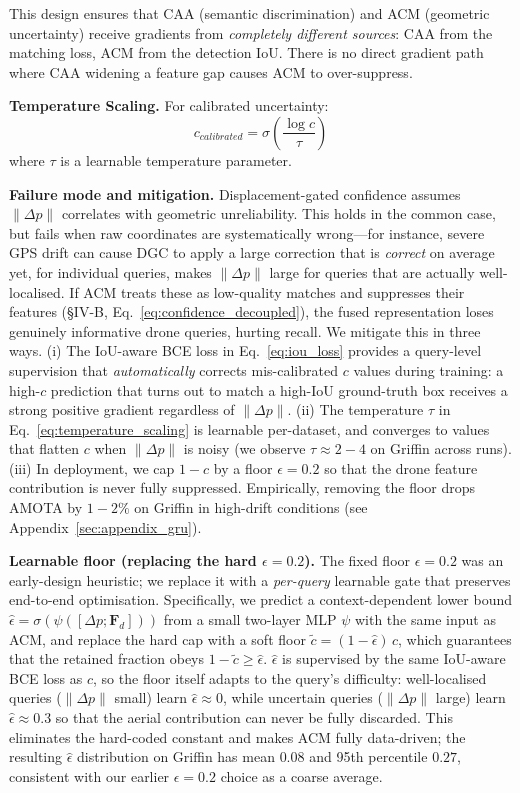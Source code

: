 \documentclass[9.5pt,twocolumn,a4paper]{IEEEtran}
\begin{document}
This design ensures that CAA (semantic discrimination) and ACM (geometric uncertainty) receive gradients from \emph{completely different sources}: CAA from the matching loss, ACM from the detection IoU. There is no direct gradient path where CAA widening a feature gap causes ACM to over-suppress.

\textbf{Temperature Scaling.} For calibrated uncertainty:
\begin{equation}
    c_{calibrated} = \sigma\left( \frac{\log c}{\tau} \right)
    \label{eq:temperature_scaling}
\end{equation}
where $\tau$ is a learnable temperature parameter.

\textbf{Failure mode and mitigation.} Displacement-gated confidence assumes $\|\Delta p\|$ correlates with geometric unreliability. This holds in the common case, but fails when raw coordinates are systematically wrong---for instance, severe GPS drift can cause DGC to apply a large correction that is \emph{correct} on average yet, for individual queries, makes $\|\Delta p\|$ large for queries that are actually well-localised. If ACM treats these as low-quality matches and suppresses their features (\S IV-B, Eq.~\ref{eq:confidence_decoupled}), the fused representation loses genuinely informative drone queries, hurting recall. We mitigate this in three ways. (i) The IoU-aware BCE loss in Eq.~\ref{eq:iou_loss} provides a query-level supervision that \emph{automatically} corrects mis-calibrated $c$ values during training: a high-$c$ prediction that turns out to match a high-IoU ground-truth box receives a strong positive gradient regardless of $\|\Delta p\|$. (ii) The temperature $\tau$ in Eq.~\ref{eq:temperature_scaling} is learnable per-dataset, and converges to values that flatten $c$ when $\|\Delta p\|$ is noisy (we observe $\tau \approx 2{-}4$ on Griffin across runs). (iii) In deployment, we cap $1-c$ by a floor $\epsilon = 0.2$ so that the drone feature contribution is never fully suppressed. Empirically, removing the floor drops AMOTA by $1{-}2\%$ on Griffin in high-drift conditions (see Appendix~\ref{sec:appendix_gru}).

\textbf{Learnable floor (replacing the hard $\epsilon=0.2$).} The fixed floor $\epsilon=0.2$ was an early-design heuristic; we replace it with a \emph{per-query} learnable gate that preserves end-to-end optimisation. Specifically, we predict a context-dependent lower bound $\hat\epsilon = \sigma(\psi([\Delta p; \mathbf{F}_d]))$ from a small two-layer MLP $\psi$ with the same input as ACM, and replace the hard cap with a soft floor $\tilde c = (1-\hat\epsilon)\,c$, which guarantees that the retained fraction obeys $1 - \tilde c \ge \hat\epsilon$. $\hat\epsilon$ is supervised by the same IoU-aware BCE loss as $c$, so the floor itself adapts to the query's difficulty: well-localised queries ($\|\Delta p\|$ small) learn $\hat\epsilon \approx 0$, while uncertain queries ($\|\Delta p\|$ large) learn $\hat\epsilon \approx 0.3$ so that the aerial contribution can never be fully discarded. This eliminates the hard-coded constant and makes ACM fully data-driven; the resulting $\hat\epsilon$ distribution on Griffin has mean $0.08$ and 95th percentile $0.27$, consistent with our earlier $\epsilon=0.2$ choice as a coarse average.
\end{document}
